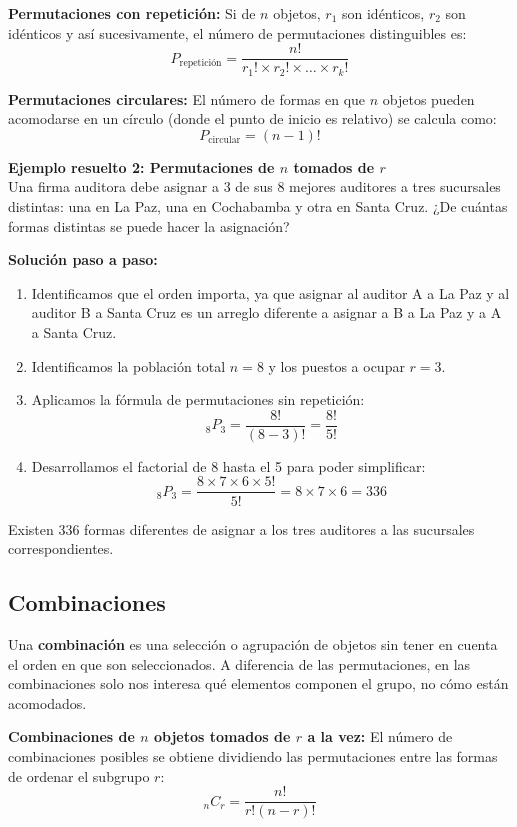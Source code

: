 \documentclass[12pt,a4paper]{article}
\begin{document}
\textbf{Permutaciones con repetición:} Si de $n$ objetos, $r_{1}$ son idénticos, $r_{2}$ son idénticos y así sucesivamente, el número de permutaciones distinguibles es:
\[
P_{\text{repetición}} = \frac{n!}{r_{1}! \times r_{2}! \times \dots \times r_{k}!}
\]

\textbf{Permutaciones circulares:} El número de formas en que $n$ objetos pueden acomodarse en un círculo (donde el punto de inicio es relativo) se calcula como:
\[
P_{\text{circular}} = (n-1)!
\]

\vspace{0.5cm}
\textbf{Ejemplo resuelto 2: Permutaciones de $n$ tomados de $r$} \\
Una firma auditora debe asignar a 3 de sus 8 mejores auditores a tres sucursales distintas: una en La Paz, una en Cochabamba y otra en Santa Cruz. ¿De cuántas formas distintas se puede hacer la asignación?

\textbf{Solución paso a paso:}
\begin{enumerate}[noitemsep]
    \item Identificamos que el orden importa, ya que asignar al auditor A a La Paz y al auditor B a Santa Cruz es un arreglo diferente a asignar a B a La Paz y a A a Santa Cruz.
    \item Identificamos la población total $n = 8$ y los puestos a ocupar $r = 3$.
    \item Aplicamos la fórmula de permutaciones sin repetición:
    \[
    _{8}P_{3} = \frac{8!}{(8-3)!} = \frac{8!}{5!}
    \]
    \item Desarrollamos el factorial de 8 hasta el 5 para poder simplificar:
    \[
    _{8}P_{3} = \frac{8 \times 7 \times 6 \times 5!}{5!} = 8 \times 7 \times 6 = 336
    \]
\end{enumerate}
Existen 336 formas diferentes de asignar a los tres auditores a las sucursales correspondientes.

\subsection{Combinaciones}
Una \textbf{combinación} es una selección o agrupación de objetos sin tener en cuenta el orden en que son seleccionados. A diferencia de las permutaciones, en las combinaciones solo nos interesa qué elementos componen el grupo, no cómo están acomodados.

\textbf{Combinaciones de $n$ objetos tomados de $r$ a la vez:} El número de combinaciones posibles se obtiene dividiendo las permutaciones entre las formas de ordenar el subgrupo $r$:
\[
_{n}C_{r} = \frac{n!}{r! (n-r)!}
\]
\end{document}
